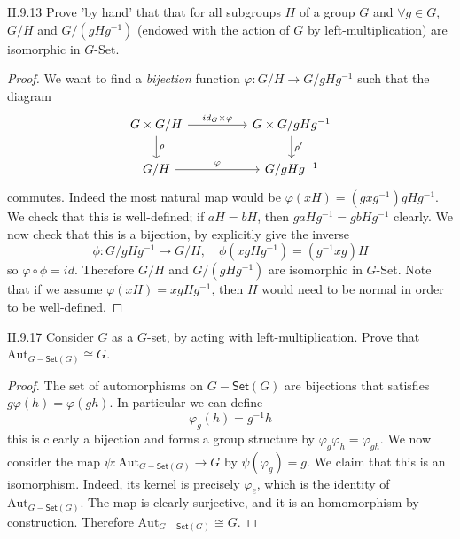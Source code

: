 \begin{problem}{II.9.13}
Prove 'by hand' that that for all subgroups $H$ of a group $G$ and $\forall g \in G$, $G/H$ and $G/(gHg^{-1})$ (endowed with the action of $G$ by left-multiplication) are isomorphic in $G$-\textsf{Set}.
\end{problem}
\begin{proof}
We want to find a \emph{bijection} function $\varphi : G/H \to G/gHg^{-1}$ such that the diagram
\[
\begin{tikzcd}
G\times G/H \arrow[rr, "id_G \times \varphi"] \arrow[d, "\rho"] &  & G \times G/gHg^{-1} \arrow[d, "\rho'"] \\
G/H \arrow[rr, "\varphi"]                                       &  & G/gHg^{-1}                            
\end{tikzcd}
\]
commutes. Indeed the most natural map would be $\varphi(xH) = (gxg^{-1})gHg^{-1}$. We check that this is well-defined; if $aH = bH$, then $gaHg^{-1} = gbHg^{-1}$ clearly.
We now check that this is a bijection, by explicitly give the inverse
\[
\phi : G/gHg^{-1} \to G/H, \quad \phi(xgHg^{-1}) = (g^{-1}xg)H
\]
so $\varphi \circ \phi = id$. Therefore $G/H$ and $G/(gHg^{-1})$ are isomorphic in $G$-\textsf{Set}. Note that if we assume $\varphi(xH) = xgHg^{-1}$, then $H$ would need to be normal in order to be well-defined.
\end{proof}



\begin{problem}{II.9.17}
Consider $G$ as a $G$-set, by acting with left-multiplication. Prove that \\ $\text{Aut}_{G-\textsf{Set}(G)}\cong G$.
\end{problem}
\begin{proof}
The set of automorphisms on $G-\textsf{Set}(G)$ are bijections that satisfies $g\varphi(h) = \varphi(gh)$. In particular we can define
\[
\varphi_g(h) = g^{-1}h
\]
this is clearly a bijection and forms a group structure by $\varphi_g \varphi_h = \varphi_{gh}$. We now consider the map $\psi : \text{Aut}_{G-\textsf{Set}(G)} \to G$ by $\psi(\varphi_g) = g$. We claim that this is an isomorphism. Indeed, its kernel is precisely $\varphi_e$, which is the identity of $\text{Aut}_{G-\textsf{Set}(G)}$. The map is clearly surjective, and it is an homomorphism by construction. Therefore $\text{Aut}_{G-\textsf{Set}(G)}\cong G$.
\end{proof}